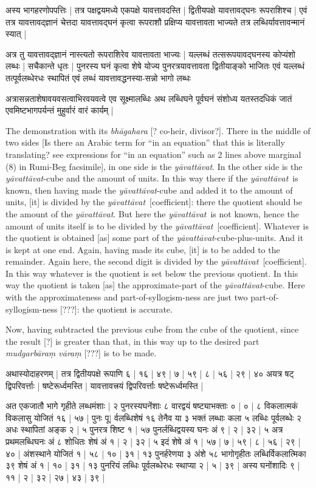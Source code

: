 \documentclass[12pt]{book}
\let\*=\d
\def\ya{\textit{y\=avat\-t\=avat}}
\begin{document}
\newpage

{\s अस्य भागहरणोपपत्तिः |
तत्र पक्षद्वयमध्ये एकपक्षे यावत्तावदस्ति |
द्वितीयपक्षे यावत्तावद्घनः रूपराशिश्च |
एवं तत्र यावत्तावद्ज्ञानं चेत्तदा यावत्तावद्घनं कृत्वा
रूपराशौ प्रक्षिप्य यावत्तावता भाज्यते तत्र लब्धिर्यावत्तावन्मानं स्यात् |

अत्र तु यावत्तावद्ज्ञानं नास्त्यतो रूपराशिरेव यावत्तावता भाज्यः |
यल्लब्धं तत्सरूपयावद्घनस्य कोप्यंशो लब्धः |
सचैकान्ते धृतः | पुनरस्य घनं कृत्वा शेषे
योज्य पुनरत्रयावत्तावता द्वितीयाङ्को भाजितः एवं यल्लब्धं तत्पूर्वलब्धेरधः स्थापितं एवं लब्धं यावत्तावद्धनस्या-सन्नो भागो लब्धः

अत्रासन्नताशेषावयवसत्वाभिरवयवत्वे एव सूक्ष्मालब्धिः अथ लब्धिघने पूर्वघनं
संशोध्य यतस्तदधिकं जातं एवमिष्टभागपर्यन्तं मुहुर्वारं वारं कार्यम् |}

\newpage

The demonstration with its \textit{bh\=agahara} [? co-heir, divisor?]. There in 
the middle of two sides [Is there an Arabic term for ``in an equation'' that this
is literally translating?  see expressions for ``in an equation'' such as 2 lines
above marginal (8) in Rumi-Beg facsimile], in one side is the \ya. 
In the other side is the \ya-cube
and the amount of units. In this way there if the \ya\ is known, then having
made the \ya-cube and added it to the amount of units, [it] is divided by 
the \ya\ [coefficient]:  there the quotient should be the amount of the \ya. But here the
\ya\ is not known, hence the amount of units itself is to be divided by the \ya\
[coefficient]. 
Whatever is the quotient is obtained [as] some part of the \ya-cube-plus-units.
And it is kept at one end. Again, having made its cube, [it] is to be added
to the remainder. Again here, the second digit is divided by the \ya\ [coefficient]. In this way
whatever is the quotient is set below the previous quotient. In this way
the quotient is taken [as] the approximate-part of the \ya-cube. Here with the 
approximateness and part-of-syllogism-ness are just two part-of-syllogism-ness [???]:
the quotient is accurate. 

Now, having subtracted the previous cube from the cube of the quotient, since
the result [?] is greater than that, in this way up to the desired part 
\textit{mudgarb\=ara\*m v\=ara\*m} [???] is to be made.

\newpage

{\s अथास्योदाहरणम् |
तत्र द्वितीयपक्षे रूपाणि ६ | १६ | ४९ | ७ | ५९ | ८ | ५६ | २९ | ४० अयत्र षट् 
द्विपरिवर्त्ताः |
षष्टेरूर्ध्वमस्ति |
यावत्तावत्त्रयं द्विपरिवर्त्ताः षष्टेरूर्ध्वमस्ति |

अत एकजातौ भागे गृहीते लब्धमंशाः | २ पुनरस्यघनेंशाः ८ वारद्वयं षष्ट्याभक्ताः ० |
० | ८ विकलात्मकं विकलासु योजितं १६ | ५७ | पुनः पू$|$\marginnote{f.~4v J}%
र्वलब्धिशेषं १६
तेनैव या ३ भक्तं लब्धाः कला ५ लब्धिः पूर्वलब्धेः २ अधः स्थापितां अङ्क २ | ५
पुनरत्र शिष्ट १ | ५७ पुनर्लब्धिद्वयस्य घनः अं ९ | २ | ३२ | ५
अत्र प्रथमलब्धिघनः अं ८
शोधितः शेषं अं १ | २ | ३२ | ५ इदं शेषे अं १ | ५७ | ७ | ५९ | ८ | ५६ | २९ | ४० | अंशस्थाने योजितं
१ | ५८ | १० | ३१ | १३ पुनर्हरेणया ३ अंशे ५८ भागोगृहीतः लब्धिर्विकलात्मिका ३९ शेषं अं १ | १० | ३१ | १३ पुनरियं लब्धिः पूर्वलब्धेरधः स्थाप्या २ | ५ |
३९ | अस्य घनोंशादिः ९ | ११ | २ | ३२ | २७ | ४३ | ३९ | }
\end{document}
